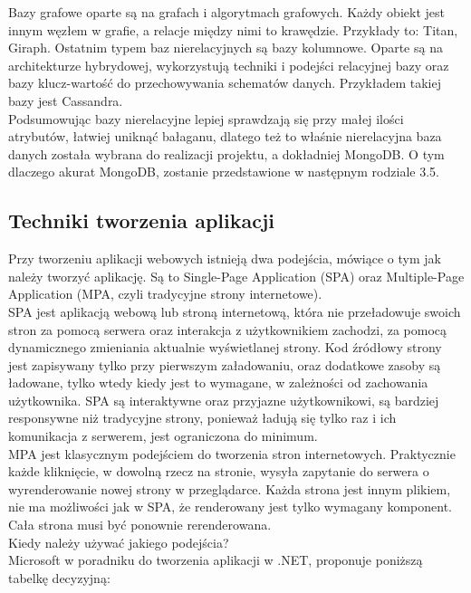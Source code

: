 \documentclass[12pt]{article}
\begin{document}
\begin{sloppypar}
{{    Bazy grafowe oparte są na grafach i algorytmach grafowych. Każdy obiekt jest innym węzłem w grafie, a relacje między nimi to krawędzie. Przykłady to: Titan, Giraph.
    Ostatnim typem baz nierelacyjnych są bazy kolumnowe. Oparte są na architekturze hybrydowej, wykorzystują techniki i podejści relacyjnej bazy oraz bazy klucz-wartość 
    do przechowywania schematów danych. Przykładem takiej bazy jest Cassandra.\\
    Podsumowując bazy nierelacyjne lepiej sprawdzają się przy małej ilości atrybutów, łatwiej uniknąć bałaganu, dlatego też to właśnie nierelacyjna baza danych została wybrana 
    do realizacji projektu, a dokładniej MongoDB. O tym dlaczego akurat MongoDB, zostanie przedstawione w następnym rodziale 3.5.
  }
  \subsection{Techniki tworzenia aplikacji}
  {
    Przy tworzeniu aplikacji webowych istnieją dwa podejścia, mówiące o tym jak należy tworzyć aplikację. 
    Są to Single-Page Application (SPA) oraz Multiple-Page Application (MPA, czyli tradycyjne strony internetowe). \\
    SPA jest aplikacją webową lub stroną internetową, która nie przeładowuje swoich stron za pomocą serwera oraz interakcja z użytkownikiem zachodzi, 
    za pomocą dynamicznego zmieniania aktualnie wyświetlanej strony. Kod źródłowy strony jest zapisywany tylko przy pierwszym załadowaniu, oraz 
    dodatkowe zasoby są ładowane, tylko wtedy kiedy jest to wymagane, w zależności od zachowania użytkownika. 
    SPA są interaktywne oraz przyjazne użytkownikowi, są bardziej responsywne niż tradycyjne strony, ponieważ ładują się tylko raz i ich komunikacja z serwerem,
    jest ograniczona do minimum. \cite{spa-conference} \\
    MPA jest klasycznym podejściem do tworzenia stron internetowych. 
    Praktycznie każde kliknięcie, w dowolną rzecz na stronie, wysyła zapytanie do serwera o wyrenderowanie nowej strony w przeglądarce.
    Każda strona jest innym plikiem, nie ma możliwości jak w SPA, że renderowany jest tylko wymagany komponent. Cała strona musi być ponownie rerenderowana. \\
    Kiedy należy używać jakiego podejścia? \\
    Microsoft w poradniku do tworzenia aplikacji w .NET, proponuje poniższą tabelkę decyzyjną\cite{mc-spa}:
    \begin{center}
      \begin{table}

\end{table}
\end{center}}}
\end{sloppypar}
\end{document}
